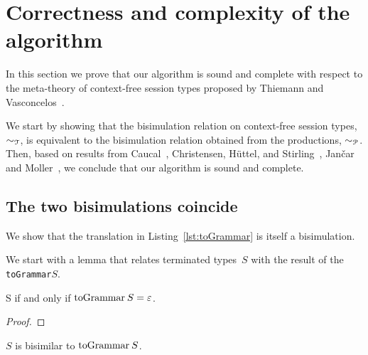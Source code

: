 \section{Correctness and complexity of the algorithm}
\label{sec:soundness}

In this section we prove that our algorithm is sound and complete
with respect to the meta-theory of context-free session types proposed
by Thiemann and Vasconcelos~\cite{thiemann2016context}.

We start by showing that the bisimulation relation on context-free
session types, $\sim_\mathcal T$, is equivalent to the bisimulation
relation obtained from the productions, $\sim_\mathcal P$.  Then, based on
results from Caucal~\cite{caucal1986decidabilite}, Christensen,
H{\"{u}}ttel, and Stirling~\cite{DBLP:journals/iandc/ChristensenHS95},
Jan{\v{c}}ar and Moller~\cite{janvcar1999techniques}, we conclude that
our algorithm is sound and complete.

\subsection{The two bisimulations coincide}

We show that the translation in Listing~\ref{lst:toGrammar} is itself
a bisimulation.

We start with a lemma that relates terminated types~$S$ with the result of
the \lstinline|toGrammar|$S$.

\begin{lemma}
  \label{lem:terminated-togrammar}
  \DONE S if and only if $\toGrammarf{S} = \varepsilon$.
\end{lemma}

\begin{proof}
\end{proof}

\begin{theorem}
\label{thm:cfst_vs_grammar}
  $S$ is bisimilar to $\toGrammarf{S}$.
\end{theorem}

